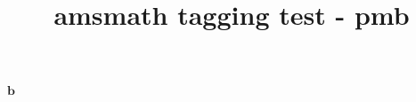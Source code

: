 \documentclass{article}
\title{amsmath tagging test - pmb}
\begin{document}
$\pmb{b}$
\end{document}

